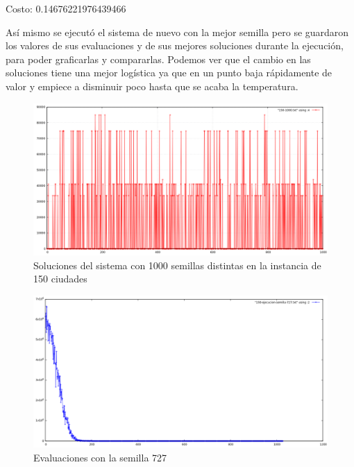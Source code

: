 \documentclass{article}
\begin{document}
Costo: 0.14676221976439466

Así mismo se ejecutó el sistema de nuevo con la mejor semilla pero se guardaron los valores de sus evaluaciones y de sus mejores soluciones durante la ejecución, para poder graficarlas y compararlas. Podemos ver que el cambio en las soluciones tiene una mejor logística ya que en un punto baja rápidamente de valor y empiece a disminuir poco hasta que se acaba la temperatura.

\begin{figure}[H]
	\includegraphics[width=\textwidth,height=\textheight,keepaspectratio]{imgs/grafica150semillas.png}
	\caption{Soluciones del sistema con 1000 semillas distintas en la instancia de 150 ciudades}
\end{figure}

\begin{figure}[H]
	\includegraphics[width=\textwidth,height=\textheight,keepaspectratio]{imgs/grafica150.png}
	\caption{Evaluaciones con la semilla 727}
\end{figure}
\end{document}
